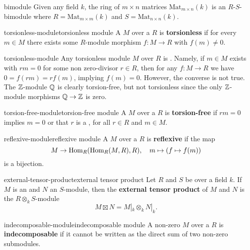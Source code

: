 \begin{example}{bimodule}
    Given any field $k$, the ring of $m \times n$ matrices $\text{Mat}_{m \times n}(k)$ is an $R$-$S$-bimodule where $R = \text{Mat}_{m \times m}(k)$ and $S = \text{Mat}_{n \times n}(k)$.
\end{example}

\begin{topic}{torsionless-module}{torsionless module}
    A  $M$ over a  $R$ is \textbf{torsionless} if for every $m \in M$ there exists some $R$-module morphism $f : M \to R$ with $f(m) \ne 0$.
\end{topic}

\begin{example}{torsionless-module}
    Any torsionless module $M$ over $R$ is . Namely, if $m \in M$ exists with $rm = 0$ for some non zero-divisor $r \in R$, then for any $f : M \to R$ we have $0 = f(rm) = rf(m)$, implying $f(m) = 0$. However, the converse is not true. The $\mathbb{Z}$-module $\mathbb{Q}$ is clearly torsion-free, but not torsionless since the only $\mathbb{Z}$-module morphisms $\mathbb{Q} \to \mathbb{Z}$ is zero.
\end{example}

\begin{topic}{torsion-free-module}{torsion-free module}
    A  $M$ over a  $R$ is \textbf{torsion-free} if $rm = 0$ implies $m = 0$ or that $r$ is a , for all $r \in R$ and $m \in M$.
\end{topic}

\begin{topic}{reflexive-module}{reflexive module}
    A  $M$ over a  $R$ is \textbf{reflexive} if the map
    \[ M \to \text{Hom}_R(\text{Hom}_R(M, R), R), \quad m \mapsto (f \mapsto f(m)) \]
    is a bijection.
\end{topic}

\begin{topic}{external-tensor-product}{external tensor product}
    Let $R$ and $S$ be  over a field $k$. If $M$ is an  and $N$ an $S$-module, then the \textbf{external tensor product} of $M$ and $N$ is the $R \otimes_k S$-module
    \[ M \boxtimes N = M|_k \otimes_k N|_k . \]
\end{topic}

\begin{topic}{indecomposable-module}{indecomposable module}
    A non-zero  $M$ over a  $R$ is \textbf{indecomposable} if it cannot be written as the direct sum of two non-zero submodules.
\end{topic}

